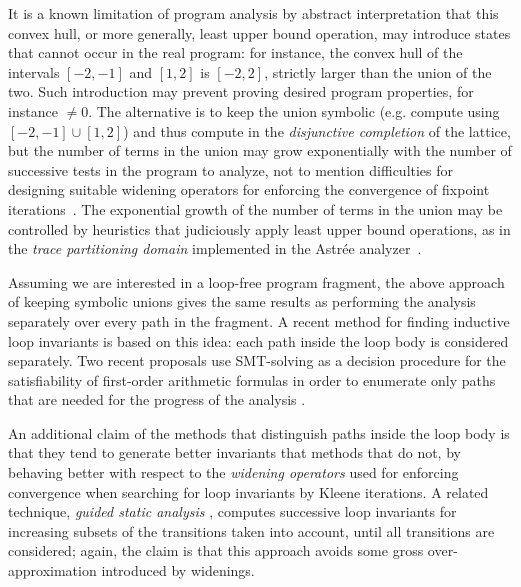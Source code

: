 \documentclass[preprint]{sigplanconf}
\begin{document}
It is a known limitation of program analysis by abstract interpretation that this convex hull, or more generally, least upper bound operation, may introduce states that cannot occur in the real program: for instance, the convex hull of the intervals $[-2,-1]$ and $[1,2]$ is $[-2,2]$, strictly larger than the union of the two.
Such introduction may prevent proving desired program properties, for instance $\neq 0$. The alternative is to keep the union symbolic (e.g. compute using $[-2,-1] \cup [1,2]$) and thus compute in the \emph{disjunctive completion}
of the lattice, but the number of terms in the union may grow exponentially with the number of successive tests in the program to analyze, not to mention difficulties for designing suitable widening operators for enforcing the convergence of fixpoint iterations~\cite{PPL,BagnaraHZ08SCP,DBLP:journals/sttt/BagnaraHZ07}.
The exponential growth of the number of terms in the union may be controlled by heuristics that judiciously apply least upper bound operations, as in the \emph{trace partitioning domain} \cite{Rival_Mauborgne_TOPLAS07} implemented in the Astr\'ee analyzer~\cite{ASTREE_TASE07,ASTREE_ESOP05,ASTREE_PLDI03}. %

Assuming we are  interested in a loop-free program fragment, the above approach of keeping symbolic unions gives the same results as performing the analysis separately over every path in the fragment.
A recent method for finding inductive loop invariants \cite{DBLP:conf/pldi/GulwaniZ10} is based on this idea: each path inside the loop body is considered separately.
Two recent proposals use SMT-solving \cite{Kroening_Strichman_08} as a decision procedure for the satisfiability of first-order arithmetic formulas in order to enumerate only paths that are needed for the progress of the analysis \cite{Gawlitza_Monniaux_ESOP11,Monniaux_Gonnord_SAS11}.

An additional claim of the methods that distinguish paths inside the loop body \cite{DBLP:conf/pldi/GulwaniZ10,Monniaux_Gonnord_SAS11} is that they tend to generate better invariants that methods that do not, by behaving better with respect to the \emph{widening operators} \cite{CousotCousot_JLC92}
used for enforcing convergence when searching for loop invariants by Kleene iterations. A related technique, \emph{guided static analysis} \cite{DBLP:conf/sas/GopanR07}, computes successive loop invariants for increasing subsets of the transitions taken into account, until all transitions are considered; again, the claim is that this approach avoids some gross over-approximation introduced by widenings.
\end{document}
